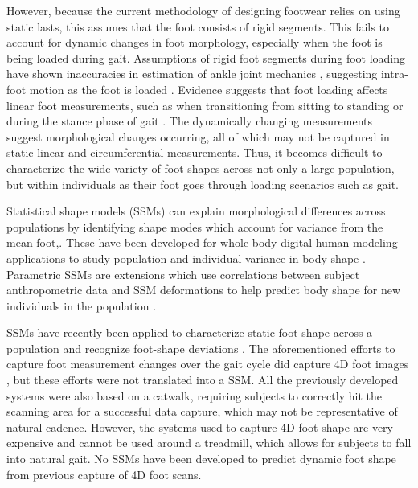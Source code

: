 \documentclass[defaultstyle,11pt]{comps}
\begin{document}
However, because the current methodology of designing footwear relies on using static lasts, this assumes that the foot consists of rigid segments.
This fails to account for dynamic changes in foot morphology, especially when the foot is being loaded during gait.
Assumptions of rigid foot segments during foot loading have shown inaccuracies in estimation of ankle joint mechanics \citep{Zelik2018, Kessler2020}, suggesting intra-foot motion as the foot is loaded \citep{Lundgren2008, Wolf2008}.
Evidence suggests that foot loading affects linear foot measurements, such as when transitioning from sitting to standing \citep{Xiong2009, Oladipo2008} or during the stance phase of gait \citep{Kouchi2009, Barisch-Fritz2014, Grau2018}.
The dynamically changing measurements suggest morphological changes occurring, all of which may not be captured in static linear and circumferential measurements.
Thus, it becomes difficult to characterize the wide variety of foot shapes across not only a large population, but within individuals as their foot goes through loading scenarios such as gait.

Statistical shape models (SSMs) can explain morphological differences across populations by identifying shape modes which account for variance from the mean foot,.
These have been developed for whole-body digital human modeling applications to study population and individual variance in body shape \citep{Allen2003, Anguelov2005, Reed2014, Park2015a, Park2017}.
Parametric SSMs are extensions which use correlations between subject anthropometric data and SSM deformations to help predict body shape for new individuals in the population \citep{Park2015a, Park2017}.

SSMs have recently been applied to characterize static foot shape across a population \citep{Conrad2019} and recognize foot-shape deviations \citep{Stankovic2020}.
The aforementioned efforts to capture foot measurement changes over the gait cycle did capture 4D foot images \citep{Barisch-Fritz2014, Grau2018}, but these efforts were not translated into a SSM.
All the previously developed systems were also based on a catwalk, requiring subjects to correctly hit the scanning area for a successful data capture, which may not be representative of natural cadence. However, the systems used to capture 4D foot shape are very expensive and cannot be used around a treadmill, which allows for subjects to fall into natural gait. No SSMs have been developed to predict dynamic foot shape from previous capture of 4D foot scans.
\end{document}
